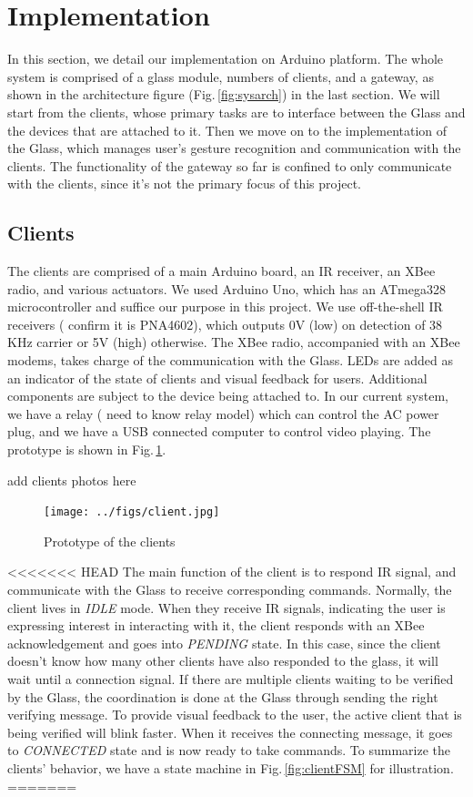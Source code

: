 \section{Implementation}
\label{sec:implementation}

In this section, we detail our implementation on Arduino \cite{Arduino} platform. The whole system is comprised of a glass module, numbers of clients, and a gateway, as shown in the architecture figure (Fig.\,\ref{fig:sysarch}) in the last section. We will start from the clients, whose primary tasks are to interface between the Glass and the devices that are attached to it. Then we move on to the implementation of the Glass, which manages user's gesture recognition and communication with the clients. The functionality of the gateway so far is confined to only communicate with the clients, since it's not the primary focus of this project.

\subsection{Clients}
The clients are comprised of a main Arduino board, an IR receiver, an XBee radio, and various actuators. We used Arduino Uno, which has an ATmega328 microcontroller and suffice our purpose in this project. We use off-the-shell IR receivers ({\color{red} confirm it is PNA4602}), which outputs 0V (low) on detection of 38 KHz carrier or 5V (high) otherwise. The XBee radio, accompanied with an XBee modems, takes charge of the communication with the Glass. LEDs are added as an indicator of the state of clients and visual feedback for users. Additional components are subject to the device being attached to. In our current system, we have a relay ({\color{red} need to know relay model}) which can control the AC power plug, and we have a USB connected computer to control video playing. The prototype is shown in Fig.\,\ref{fig:client}.

{\color{red} add clients photos here}
\begin{figure}
  \centering
  \texttt{[image: ../figs/client.jpg]}
  \caption{Prototype of the clients}
  \label{fig:client}
\end{figure}

<<<<<<< HEAD
The main function of the client is to respond IR signal, and communicate with the Glass to receive corresponding commands. Normally, the client lives in {\it IDLE} mode. When they receive IR signals, indicating the user is expressing interest in interacting with it, the client responds with an XBee acknowledgement and goes into {\it PENDING} state. In this case, since the client doesn't know how many other clients have also responded to the glass, it will wait until a connection signal. If there are multiple clients waiting to be verified by the Glass, the coordination is done at the Glass through sending the right verifying message. To provide visual feedback to the user, the active client that is being verified will blink faster. When it receives the connecting message, it goes to {\it CONNECTED} state and is now ready to take commands. To summarize the clients' behavior, we have a state machine in Fig.\,\ref{fig:clientFSM} for illustration.
=======

